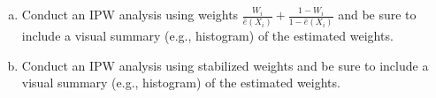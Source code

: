 \documentclass[11pt,letter]{article}
\begin{document}
\begin{enumerate}[(a)]
\item
  \begin{quoting}
    Conduct an IPW analysis using weights
    $\frac{W_i}{\hat e(X_i)} + \frac{1 - W_i}{1 - \hat e(X_i)}$ and be
    sure to include a visual summary (e.g., histogram) of the
    estimated weights.
  \end{quoting}

  

\item
  \begin{quoting}
    Conduct an IPW analysis using stabilized weights and be sure to
    include a visual summary (e.g., histogram) of the estimated
    weights.
  \end{quoting}
  
\end{enumerate}


\end{document}
